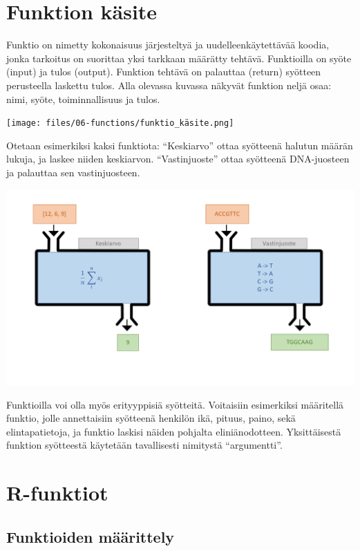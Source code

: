 \documentclass[
]{book}
\begin{document}
\hypertarget{funktion-kuxe4site}{%
\section{Funktion käsite}\label{funktion-kuxe4site}}

Funktio on nimetty kokonaisuus järjesteltyä ja uudelleenkäytettävää koodia, jonka tarkoitus on suorittaa yksi tarkkaan määrätty tehtävä. Funktioilla on syöte (input) ja tulos (output). Funktion tehtävä on palauttaa (return) syötteen perusteella laskettu tulos. Alla olevassa kuvassa näkyvät funktion neljä osaa: nimi, syöte, toiminnallisuus ja tulos.

\texttt{[image: files/06-functions/funktio\_käsite.png]}

Otetaan esimerkiksi kaksi funktiota: ``Keskiarvo'' ottaa syötteenä halutun määrän lukuja, ja laskee niiden keskiarvon. ``Vastinjuoste'' ottaa syötteenä DNA-juosteen ja palauttaa sen vastinjuosteen.

\includegraphics{files/06-functions/funktio_esimerkit.png}

Funktioilla voi olla myös erityyppisiä syötteitä. Voitaisiin esimerkiksi määritellä funktio, jolle annettaisiin syötteenä henkilön ikä, pituus, paino, sekä elintapatietoja, ja funktio laskisi näiden pohjalta eliniänodotteen. Yksittäisestä funktion syötteestä käytetään tavallisesti nimitystä ``argumentti''.

\hypertarget{r-funktiot}{%
\section{R-funktiot}\label{r-funktiot}}

\hypertarget{funktioiden-muxe4uxe4rittely}{%
\subsection{Funktioiden määrittely}\label{funktioiden-muxe4uxe4rittely}}
\end{document}
